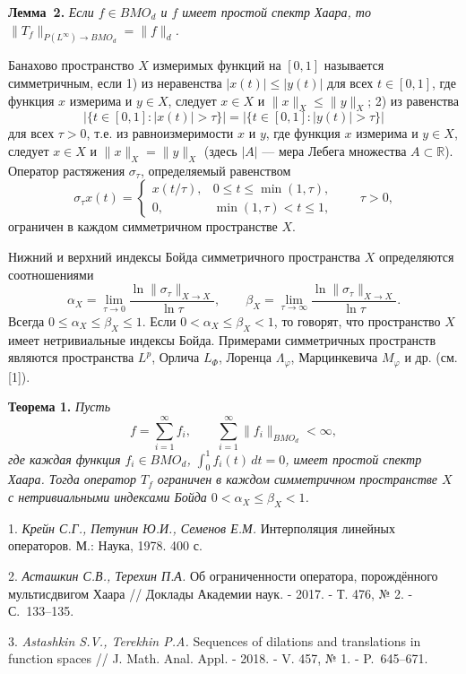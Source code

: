 \textbf{Лемма~2.} {\it Если $f\in BMO_d$ и $f$ имеет простой спектр Хаара, то $\|T_f\|_{P(L^{\infty})\to BMO_d}=\|f\|_d$.}

Банахово пространство $X$ измеримых функций на $[0,1]$ называется симметричным, если
1) из неравенства $|x(t)|\leqslant|y(t)|$ для всех $t\in[0,1]$,
где функция $x$ измерима и $y\in X$, следует $x\in X$ и $\|x\|_X\leqslant\|y\|_X$;
2) из равенства
$$
|\{t\in[0,1]:|x(t)|>\tau\}|=|\{t\in[0,1]:|y(t)|>\tau\}|
$$
для всех $\tau>0$, т.е. из равноизмеримости $x$ и $y$, где функция $x$ измерима и $y\in X$,
следует $x\in X$ и $\|x\|_X=\|y\|_X$ (здесь $|A|$ --- мера Лебега множества $A\subset\mathbb{R}$).
Оператор растяжения $\sigma_{\tau}$, определяемый равенством
$$
\sigma_{\tau}x(t)=\begin{cases}
x(t/\tau), & 0\leqslant t\leqslant\min(1,\tau),\\
0, & \min(1,\tau)<t\leqslant1,
\end{cases}
\qquad \tau>0,
$$
ограничен в каждом симметричном пространстве $X$.

Нижний и верхний индексы Бойда симметричного пространства $X$ определяются соотношениями
$$
\alpha_X=\lim_{\tau\to0}\frac{\ln\|\sigma_{\tau}\|_{X\to X}}{\ln\tau}, \qquad
\beta_X=\lim_{\tau\to\infty}\frac{\ln\|\sigma_{\tau}\|_{X\to X}}{\ln\tau}.
$$
Всегда $0\leqslant\alpha_X\leqslant\beta_X\leqslant1$. Если $0<\alpha_X\leqslant\beta_X<1$, то говорят, что пространство $X$ имеет нетривиальные индексы Бойда.
Примерами симметричных пространств являются пространства $L^p$, Орлича $L_{\varPhi}$, Лоренца $\varLambda_{\varphi}$, Марцинкевича $M_{\varphi}$ и др. (см. [1]).

\textbf{Теорема 1.} {\it Пусть
$$
f=\sum_{i=1}^{\infty}f_i, \qquad \sum_{i=1}^{\infty}\|f_i\|_{BMO_d}<\infty,
$$
где каждая функция $f_i\in BMO_d$, $\int_0^1f_i(t)\,dt=0$, имеет простой спектр Хаара. Тогда оператор $T_f$ ограничен в каждом симметричном пространстве $X$ с нетривиальными индексами Бойда $0<\alpha_X\leqslant\beta_X<1$.}


\litlist

1. {\it Крейн С.Г., Петунин Ю.И., Семенов Е.М.} Интерполяция линейных операторов. М.: Наука, 1978. 400 с.

2. {\it Асташкин С.В., Терехин П.А.} Об ограниченности оператора, порождённого мультисдвигом Хаара // Доклады Академии наук. - 2017. -
Т. 476, № 2. - С.~133--135.

3. {\it Astashkin S.V., Terekhin P.A.} Sequences of dilations and translations in function spaces // J. Math. Anal. Appl. - 2018. -
V. 457, № 1. - P.~645--671.
